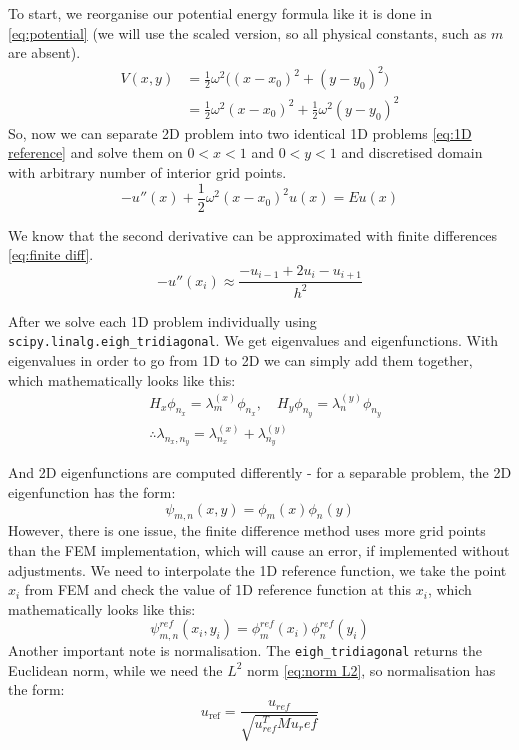 \documentclass[acmsmall,screen]{MapleTrans}
\begin{document}
To start, we reorganise our potential energy formula like it is done in \eqref{eq:potential} (we will use the scaled version, so all physical constants, such as $m$ are absent).
\begin{equation}
\begin{aligned}
    V(x, y) &= \frac{1}{2} \omega^2\Big((x - x_0)^2 + (y - y_0)^2\Big) \\
    &= \frac{1}{2}\omega^2(x - x_0)^2 + \frac{1}{2}\omega^2(y - y_0)^2
    \label{eq:potential}
\end{aligned}
\end{equation}
So, now we can separate 2D problem into two identical 1D problems \eqref{eq:1D reference} and solve them on $0 < x < 1$ and $0 < y < 1$ and discretised domain with arbitrary number of interior grid points.
\begin{equation}
    -u''(x) + \frac{1}{2}\omega^2(x - x_0)^2u(x) = Eu(x)
    \label{eq:1D reference}
\end{equation}

We know that the second derivative can be approximated with finite differences \eqref{eq:finite diff}.
\begin{equation}
    -u''(x_i) \approx \frac{-u_{i-1} + 2u_i - u_{i+1}}{h^2}
    \label{eq:finite diff}
\end{equation}

After we solve each 1D problem individually using \texttt{scipy.linalg.eigh\_tridiagonal}. We get eigenvalues and eigenfunctions. With eigenvalues in order to go from 1D to 2D we can simply add them together, which mathematically looks like this:
\begin{equation}
\begin{aligned}
    &H_x\phi_{n_x} = \lambda_m^{(x)}\phi_{n_x}, \quad H_y\phi_{n_y} = \lambda_n^{(y)}\phi_{n_y} \\
    &\therefore \lambda_{n_x,n_y} = \lambda_{n_x}^{(x)} + \lambda_{n_y}^{(y)}
\end{aligned}
\end{equation}

And 2D eigenfunctions are computed differently - for a separable problem, the 2D eigenfunction has the form:
\begin{equation}
    \psi_{m,n}(x, y) = \phi_m(x)\phi_n(y)
\end{equation}
However, there is one issue, the finite difference method uses more grid points than the FEM implementation, which will cause an error, if implemented without adjustments. We need to interpolate the 1D reference function, we take the point $x_i$ from FEM and check the value of 1D reference function at this $x_i$, which mathematically looks like this:
\begin{equation}
    \psi_{m, n}^{ref}(x_i, y_i) = \phi_m^{ref}(x_i)\phi_n^{ref}(y_i)
\end{equation}
Another important note is normalisation. The \texttt{eigh\_tridiagonal} returns the Euclidean norm, while we need the $L^2$ norm \eqref{eq:norm L2}, so normalisation has the form:
\begin{equation}
    u_{\mathrm{ref}} = \frac{u_{ref}}{\sqrt{u_{ref}^TMu_ref}}
\end{equation}
\end{document}
